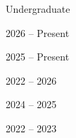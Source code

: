 \documentclass[cv.tex]{subfiles}
\begin{document}



\vspace{4mm}
\noindent
{\color{themecolor} \large Undergraduate}

\par\noindent
\parbox{0.18\textwidth}{%
	\raggedleft

	2026 -- Present \par
	\null \par
	\null \par
	\null \par

	\vspace{1mm}
	2025 -- Present \par
	\null \par
	\null \par
	\null \par
	\null \par

	\vspace{1mm}
	2022 -- 2026 \par
	\null \par
	\null \par
	\null \par

	\vspace{1mm}
	2024 -- 2025 \par
	\null \par
	\null \par
	\null \par

	\vspace{1mm}
	2022 -- 2023 \par
	\null \par
	\null \par

}
\hspace{1mm}
\end{document}
